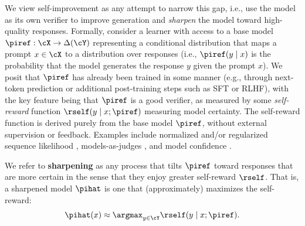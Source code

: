 We view self-improvement as any attempt to narrow this gap, i.e., use the model as its own
verifier to improve generation and \emph{sharpen} the model toward
  high-quality responses.
Formally, consider a learner with access to a base model
$\piref:\cX\to\Delta(\cY)$ representing a conditional distribution
that maps a prompt $x\in\cX$ to a distribution over responses
(i.e., $\piref(y\mid{}x)$ is the probability that the model generates
the response $y$ given the prompt $x$). 
We posit that $\piref$ has already been trained in some manner
  (e.g., through next-token prediction or additional post-training steps such as SFT or RLHF), 
with the key feature being that $\piref$ is a good verifier, as measured by some \emph{self-reward} function $\rself (y \mid x; \piref)$ measuring model certainty.
The self-reward
function is derived purely from the base model $\piref$, without external supervision or feedback. Examples include
normalized and/or regularized sequence likelihood \citep{meister2020if}, models-as-judges \citep{zheng2024judging,yuan2024self,wu2024meta,wang2024self}, and model
confidence \citep{wang2024chain}.\loose



\begin{tcolorbox}[enhanced,title=Sharpening,
    colframe=blue!40!black,
    colback=blue!2!white,
    fonttitle=\bfseries,
  attach boxed title to top text left={xshift=30mm,yshift=-2.5mm},
  boxed title style={size=small,colframe=blue!40!black,colback=blue!40!black}]
    We refer to \textbf{sharpening} as any process that tilts $\piref$
  toward responses that are more certain in the sense that they
  enjoy greater self-reward $\rself$.
  That is, a sharpened model $\pihat$ is one that
  (approximately) maximizes the self-reward:
  \loose
  \begin{align}
    \label{eq:sharpening}
    \pihat(x)\approx \argmax_{y\in\cY}\rself(y\mid{}x; \piref).
  \end{align}
\end{tcolorbox}
            
